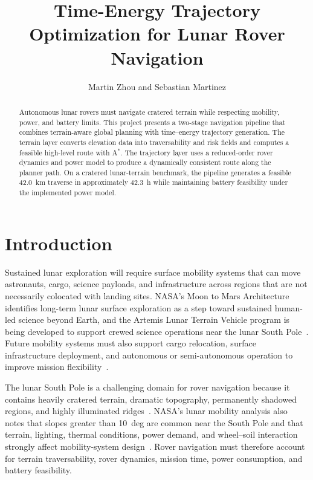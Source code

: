 \documentclass[conf]{new-aiaa}
\title{Time-Energy Trajectory Optimization for Lunar Rover Navigation}
\author{Martin Zhou and Sebastian Martinez}
\affil{Stanford University, Stanford, CA}
\begin{document}
\maketitle

\begin{abstract}
Autonomous lunar rovers must navigate cratered terrain while respecting mobility, power, and battery limits. This project presents a two-stage navigation pipeline that combines terrain-aware global planning with time--energy trajectory generation. The terrain layer converts elevation data into traversability and risk fields and computes a feasible high-level route with A$^\ast$. The trajectory layer uses a reduced-order rover dynamics and power model to produce a dynamically consistent route along the planner path. On a cratered lunar-terrain benchmark, the pipeline generates a feasible \SI{42.0}{km} traverse in approximately \SI{42.3}{h} while maintaining battery feasibility under the implemented power model.
\end{abstract}

\section{Introduction}
Sustained lunar exploration will require surface mobility systems that can move astronauts, cargo, science payloads, and infrastructure across regions that are not necessarily colocated with landing sites. NASA's Moon to Mars Architecture identifies long-term lunar surface exploration as a step toward sustained human-led science beyond Earth, and the Artemis Lunar Terrain Vehicle program is being developed to support crewed science operations near the lunar South Pole~\cite{nasa_moon_to_mars_architecture,nasa_ltv}. Future mobility systems must also support cargo relocation, surface infrastructure deployment, and autonomous or semi-autonomous operation to improve mission flexibility~\cite{nasa_lunar_mobility_drivers_2024}.

The lunar South Pole is a challenging domain for rover navigation because it contains heavily cratered terrain, dramatic topography, permanently shadowed regions, and highly illuminated ridges~\cite{lpi_south_pole_atlas}. NASA's lunar mobility analysis also notes that slopes greater than \SI{10}{deg} are common near the South Pole and that terrain, lighting, thermal conditions, power demand, and wheel--soil interaction strongly affect mobility-system design~\cite{nasa_lunar_mobility_drivers_2024}. Rover navigation must therefore account for terrain traversability, rover dynamics, mission time, power consumption, and battery feasibility.
\end{document}
